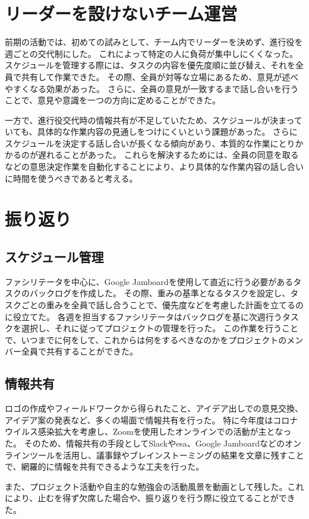 \section{リーダーを設けないチーム運営}
前期の活動では、初めての試みとして、チーム内でリーダーを決めず、進行役を週ごとの交代制にした。
これによって特定の人に負荷が集中しにくくなった。
スケジュールを管理する際には、タスクの内容を優先度順に並び替え、それを全員で共有して作業できた。
その際、全員が対等な立場にあるため、意見が述べやすくなる効果があった。
さらに、全員の意見が一致するまで話し合いを行うことで、意見や意識を一つの方向に定めることができた。

一方で、進行役交代時の情報共有が不足していたため、スケジュールが決まっていても、具体的な作業内容の見通しをつけにくいという課題があった。
さらにスケジュールを決定する話し合いが長くなる傾向があり、本質的な作業にとりかかるのが遅れることがあった。
これらを解決するためには、全員の同意を取るなどの意思決定作業を自動化することにより、より具体的な作業内容の話し合いに時間を使うべきであると考える。

\section{振り返り}
\subsection{スケジュール管理}
ファシリテータを中心に、Google Jamboardを使用して直近に行う必要があるタスクのバックログを作成した。
その際、重みの基準となるタスクを設定し、タスクごとの重みを全員で話し合うことで、優先度などを考慮した計画を立てるのに役立てた。
各週を担当するファシリテータはバックログを基に次週行うタスクを選択し、それに従ってプロジェクトの管理を行った。
この作業を行うことで、いつまでに何をして、これからは何をするべきなのかをプロジェクトのメンバー全員で共有することができた。

\subsection{情報共有}
ロゴの作成やフィールドワークから得られたこと、アイデア出しでの意見交換、アイデア案の発表など、多くの場面で情報共有を行った。
特に今年度はコロナウイルス感染拡大を考慮し、Zoomを使用したオンラインでの活動が主となった。
そのため、情報共有の手段としてSlackやesa、Google Jamboardなどのオンラインツールを活用し、議事録やブレインストーミングの結果を文章に残すことで、網羅的に情報を共有できるような工夫を行った。

また、プロジェクト活動や自主的な勉強会の活動風景を動画として残した。これにより、止むを得ず欠席した場合や、振り返りを行う際に役立てることができた。
